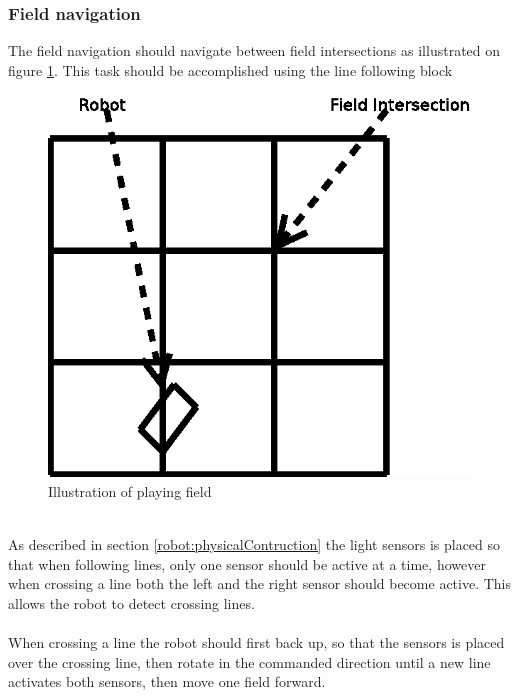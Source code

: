 \documentclass[draft, english, a4paper, 10pt]{article}
\begin{document}
		\subsubsection{Field navigation} %
		    The field navigation should navigate between field intersections
		    as illustrated on figure \ref{fig:robotFieldNavigation}.
		    This task should be accomplished using the line following block\\
		    \begin{figure}[htp]
                \centering
    	        \includegraphics[scale=0.45]{robotFieldNavigation}
	            \caption{Illustration of playing field}\label{fig:robotFieldNavigation}
            \end{figure}
		    \\
		    As described in section \ref{robot:physicalContruction} the light
		    sensors is placed so that when following lines, only one sensor should
		    be active at a time, however when crossing a line both the left and the
		    right sensor should become active. This allows the robot to detect
		    crossing lines.\\
		    \\
		    When crossing a line the robot should first back up, so that the sensors
		    is placed over the crossing line, then rotate in the commanded direction
		    until a new line activates both sensors, then move one field
		    forward.
\end{document}
